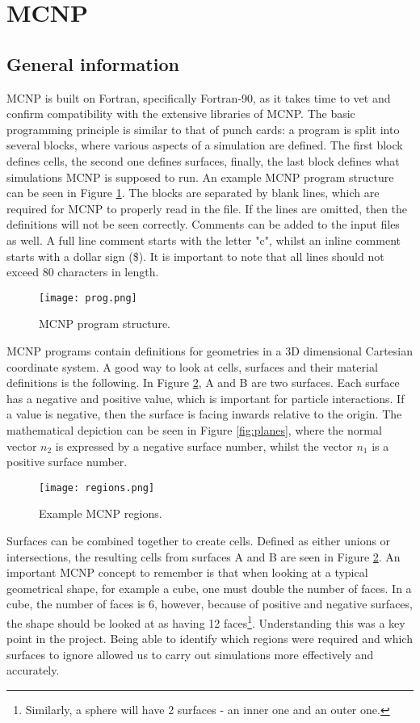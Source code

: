 \label{sec:mcnp}
\section{MCNP}
\subsection{General information}
MCNP is built on Fortran, specifically Fortran-90, as it takes time to vet and confirm compatibility with the extensive libraries of MCNP. The basic programming principle is similar to that of punch cards: a program is split into several blocks, where various aspects of a simulation are defined. The first block defines cells, the second one defines surfaces, finally, the last block defines what simulations MCNP is supposed to run. An example MCNP program structure can be seen in Figure \ref{fig:program}. The blocks are separated by blank lines, which are required for MCNP to properly read in the file. If the lines are omitted, then the definitions will not be seen correctly. Comments can be added to the input files as well. A full line comment starts with the letter "c", whilst an inline comment starts with a dollar sign (\$). It is important to note that all lines should not exceed 80 characters in length.

\begin{figure}[!htbp]
\centering
\texttt{[image: prog.png]}
\caption{MCNP program structure.}
\label{fig:program}
\end{figure}

MCNP programs contain definitions for geometries in a 3D dimensional Cartesian coordinate system. A good way to look at cells, surfaces and their material definitions is the following. In Figure \ref{fig:regions}, A and B are two surfaces. Each surface has a negative and positive value, which is important for particle interactions. If a value is negative, then the surface is facing inwards relative to the origin. The mathematical depiction can be seen in Figure \ref{fig:planes}, where the normal vector $n_2$ is expressed by a negative surface number, whilst the vector $n_1$ is a positive surface number.

\begin{figure}[!htbp]
\centering
\texttt{[image: regions.png]}
\caption{Example MCNP regions.}
\label{fig:regions}
\end{figure}

Surfaces can be combined together to create cells. Defined as either unions or intersections, the resulting cells from surfaces A and B are seen in Figure \ref{fig:regions}. An important MCNP concept to remember is that when looking at a typical geometrical shape, for example a cube, one must double the number of faces. In a cube, the number of faces is 6, however, because of positive and negative surfaces, the shape should be looked at as having 12 faces\footnote{Similarly, a sphere will have 2 surfaces - an inner one and an outer one.}. Understanding this was a key point in the project. Being able to identify which regions were required and which surfaces to ignore allowed us to carry out simulations more effectively and accurately.

